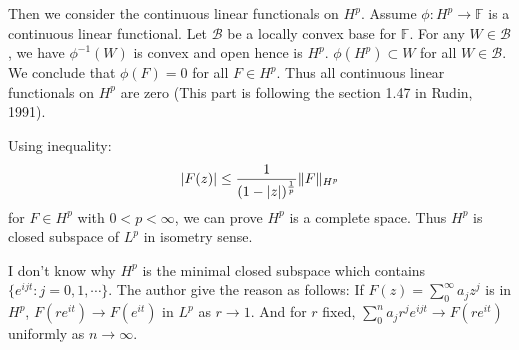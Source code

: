 Then we consider the continuous linear functionals on $H^p$. Assume $\phi:H^p\to \mathbb{F}$ is a continuous linear functional. Let $\mathscr{B}$ be a locally convex base for $\mathbb{F}$. For any $W\in \mathscr{B}$, we
have $\phi^{-1}(W)$ is convex and open hence is $H^p$. $\phi(H^p)\subset W$ for all $W\in \mathscr{B}$. We conclude that $\phi(F)=0$ for all $F\in H^p$. Thus all continuous linear functionals on $H^p$ are zero (This part is following the section 1.47 in Rudin, 1991).
\par
Using inequality:
\begin{equation*}
    \left\lvert F(z)\right\rvert\leq\frac{1}{(1-\left\lvert z\right\rvert)^{\frac{1}{p}}}\lVert F\rVert_{H^p}
\end{equation*}
for $F\in H^p$ with $0<p<\infty$, we can prove $H^p$ is a complete space. Thus $H^p$ is closed subspace of $L^p$ in isometry sense.
\begin{remark}
    {\color{blue}I don't know why $H^p$ is the minimal closed subspace which contains $\{e^{ijt}:j=0,1,\cdots\}$. The author give the reason as follows:
        If $F(z)=\sum_0^\infty{a_jz^j}$ is in $H^p$, $F(re^{it})\to F(e^{it})$ in $L^p$ as $r\to 1$. And for $r$ fixed, $\sum_0^n{a_jr^je^{ijt}}\to F(re^{it})$
        uniformly as $n\to\infty$.}
\end{remark}
